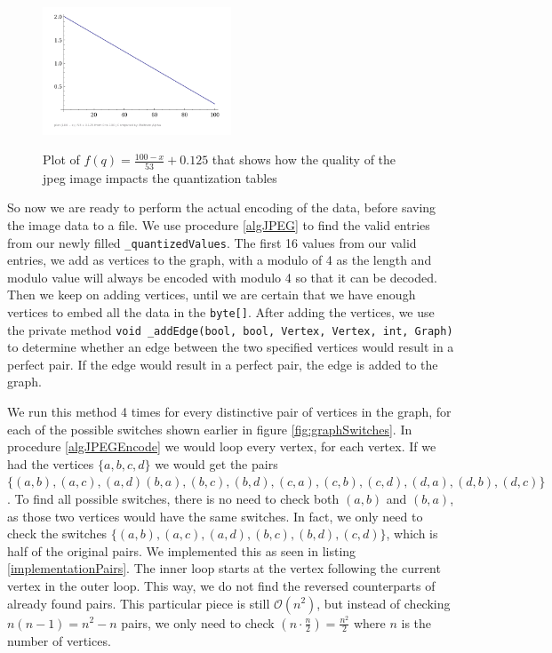 \begin{figure}
    \centering
    \includegraphics[width=0.5\textwidth]{figures/plotQuality.png}
    \label{fig:plotQuality}
    \caption{Plot of $f(q) = \frac{100-x}{53}+0.125$ that shows how the quality of the jpeg image impacts the quantization tables}
\end{figure}

So now we are ready to perform the actual encoding of the data, before saving the image data to a file.
We use procedure \ref{algJPEG} to find the valid entries from our newly filled \lstinline|_quantizedValues|.
The first 16 values from our valid entries, we add as vertices to the graph, with a modulo of 4 as the length and modulo value will always be encoded with modulo 4 so that it can be decoded.
Then we keep on adding vertices, until we are certain that we have enough vertices to embed all the data in the \lstinline|byte[]|.
After adding the vertices, we use the private method \lstinline|void _addEdge(bool, bool, Vertex, Vertex, int, Graph)| to determine whether an edge between the two specified vertices would result in a perfect pair.
If the edge would result in a perfect pair, the edge is added to the graph.

We run this method 4 times for every distinctive pair of vertices in the graph, for each of the possible switches shown earlier in figure \ref{fig:graphSwitches}.
In procedure \ref{algJPEGEncode} we would loop every vertex, for each vertex.
If we had the vertices $\{a,b,c,d\}$ we would get the pairs $\{(a,b),(a,c),(a,d)(b,a),(b,c),(b,d),(c,a),(c,b),(c,d),(d,a),(d,b),(d,c)\}$.
To find all possible switches, there is no need to check both $(a,b)$ and $(b,a)$, as those two vertices would have the same switches.
In fact, we only need to check the switches $\{(a,b),(a,c),(a,d),(b,c),(b,d),(c,d)\}$, which is half of the original pairs.
We implemented this as seen in listing \ref{implementationPairs}.
The inner loop starts at the vertex following the current vertex in the outer loop.
This way, we do not find the reversed counterparts of already found pairs.
This particular piece is still $\mathcal{O}(n^2)$, but instead of checking $n(n-1)=n^2-n$ pairs, we only need to check $(n\cdot\frac{n}{2})=\frac{n^2}{2}$ where $n$ is the number of vertices. 


